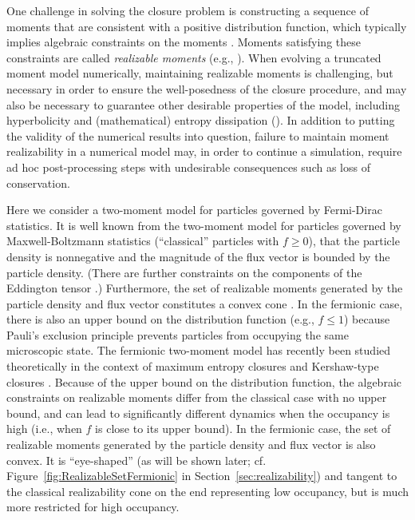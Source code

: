 One challenge in solving the closure problem is constructing a sequence of moments that are consistent with a positive distribution function, which typically implies algebraic constraints on the moments \cite{kershaw_1976,levermore_1984}.  
Moments satisfying these constraints are called \emph{realizable moments} (e.g., \cite{levermore_1996}).  
When evolving a truncated moment model numerically, maintaining realizable moments is challenging, but necessary in order to ensure the well-posedness of the closure procedure, and may also be necessary to guarantee other desirable properties of the model, including hyperbolicity and (mathematical) entropy dissipation ().  
In addition to putting the validity of the numerical results into question, failure to maintain moment realizability in a numerical model may, in order to continue a simulation, require ad hoc post-processing steps with undesirable consequences such as loss of conservation.  

Here we consider a two-moment model for particles governed by Fermi-Dirac statistics.  
It is well known from the two-moment model for particles governed by Maxwell-Boltzmann statistics (``classical'' particles with $f\ge0$), that the particle density is nonnegative and the magnitude of the flux vector is bounded by the particle density.  
(There are further constraints on the components of the Eddington tensor \cite{levermore_1984}.)  
Furthermore, the set of realizable moments generated by the particle density and flux vector constitutes a convex cone \cite{olbrant_etal_2012}.  
In the fermionic case, there is also an upper bound on the distribution function (e.g., $f\le1$) because Pauli's exclusion principle prevents particles from occupying the same microscopic state.  
The fermionic two-moment model has recently been studied theoretically in the context of maximum entropy closures \cite{lareckiBanach_2011,banachLarecki_2013,banachLarecki_2017b} and Kershaw-type closures \cite{banachLarecki_2017a}.  
Because of the upper bound on the distribution function, the algebraic constraints on realizable moments differ from the classical case with no upper bound, and can lead to significantly different dynamics when the occupancy is high (i.e., when $f$ is close to its upper bound).  
In the fermionic case, the set of realizable moments generated by the particle density and flux vector is also convex. 
It is ``eye-shaped'' (as will be shown later; cf. Figure~\ref{fig:RealizableSetFermionic} in Section~\ref{sec:realizability}) and tangent to the classical realizability cone on the end representing low occupancy, but is much more restricted for high occupancy.  

